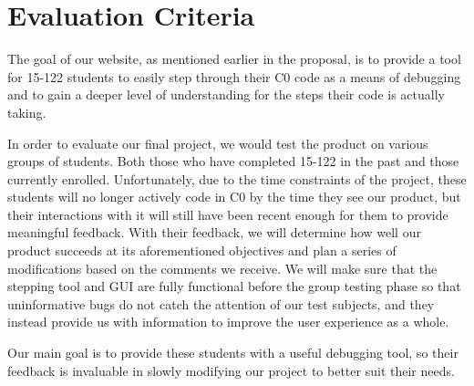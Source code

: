 \documentclass[11pt]{article}
\begin{document}
\section{Evaluation Criteria}
\par
The goal of our website, as mentioned earlier in the proposal,
is to provide a tool for 15-122 students to easily step through their C0 code
as a means of debugging and to gain a deeper level of understanding for the steps
their code is actually taking.
\par
In order to evaluate our final project, we would test the product on various groups of students.
Both those who have completed 15-122 in the past and those currently enrolled.
Unfortunately, due to the time constraints of the project, these students will no
longer actively code in C0 by the time they see our product, but their interactions
with it will still have been recent enough for them to provide meaningful feedback.
With their feedback, we will determine how well our product succeeds at its aforementioned
objectives and plan a series of modifications based on the comments we receive. We will make
sure that the stepping tool and GUI are fully functional before the group testing phase so
that uninformative bugs do not catch the attention of our test subjects, and they instead
provide us with information to improve the user experience as a whole.
\par
Our main goal is to provide these students with a useful debugging tool,
so their feedback is invaluable in slowly modifying our project to better suit their needs.
\end{document}
